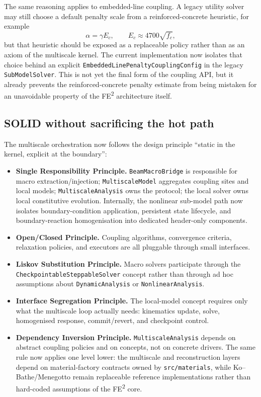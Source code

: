 The same reasoning applies to embedded-line coupling.  A legacy utility solver
may still choose a default penalty scale from a reinforced-concrete heuristic,
for example
\begin{equation}
  \alpha = \gamma E_c,
  \qquad
  E_c \approx 4700\sqrt{f_c},
  \label{eq:ms-pub-legacy-penalty-heuristic}
\end{equation}
but that heuristic should be exposed as a replaceable policy rather than as an
axiom of the multiscale kernel.  The current implementation now isolates that
choice behind an explicit \texttt{EmbeddedLinePenaltyCouplingConfig} in the
legacy \texttt{SubModelSolver}.  This is not yet the final form of the coupling
API, but it already prevents the reinforced-concrete penalty estimate from
being mistaken for an unavoidable property of the FE\textsuperscript{2}
architecture itself.

\subsection{SOLID without sacrificing the hot path}

The multiscale orchestration now follows the design principle ``static in the
kernel, explicit at the boundary'':
\begin{itemize}
  \item \textbf{Single Responsibility Principle.}
    \texttt{BeamMacroBridge} is responsible for macro extraction/injection;
    \texttt{MultiscaleModel} aggregates coupling sites and local models;
    \texttt{MultiscaleAnalysis} owns the protocol; the local solver owns local
    constitutive evolution.  Internally, the nonlinear sub-model path now
    isolates boundary-condition application, persistent state lifecycle, and
    boundary-reaction homogenisation into dedicated header-only components.
  \item \textbf{Open/Closed Principle.}
    Coupling algorithms, convergence criteria, relaxation policies, and
    executors are all pluggable through small interfaces.
  \item \textbf{Liskov Substitution Principle.}
    Macro solvers participate through the
    \texttt{CheckpointableSteppableSolver} concept rather than through ad hoc
    assumptions about \texttt{DynamicAnalysis} or \texttt{NonlinearAnalysis}.
  \item \textbf{Interface Segregation Principle.}
    The local-model concept requires only what the multiscale loop actually
    needs: kinematics update, solve, homogenised response, commit/revert, and
    checkpoint control.
  \item \textbf{Dependency Inversion Principle.}
    \texttt{MultiscaleAnalysis} depends on abstract coupling policies and on
    concepts, not on concrete drivers.  The same rule now applies one level
    lower: the multiscale and reconstruction layers depend on material-factory
    contracts owned by \texttt{src/materials}, while Ko--Bathe/Menegotto remain
    replaceable reference implementations rather than hard-coded assumptions of
    the FE\textsuperscript{2} core.
\end{itemize}

